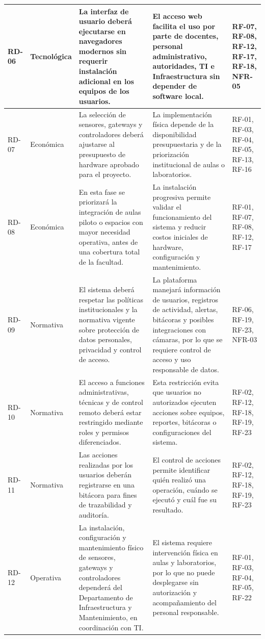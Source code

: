 \begin{longtable}{|p{3.1cm}|p{3.1cm}|p{3.1cm}|p{3.1cm}|p{3.1cm}|}
RD-06 & Tecnológica & La interfaz de usuario deberá ejecutarse en navegadores modernos sin requerir instalación adicional en los equipos de los usuarios. & El acceso web facilita el uso por parte de docentes, personal administrativo, autoridades, TI e Infraestructura sin depender de software local. & RF-07, RF-08, RF-12, RF-17, RF-18, NFR-05 \\ \hline
RD-07 & Económica & La selección de sensores, gateways y controladores deberá ajustarse al presupuesto de hardware aprobado para el proyecto. & La implementación física depende de la disponibilidad presupuestaria y de la priorización institucional de aulas o laboratorios. & RF-01, RF-03, RF-04, RF-05, RF-13, RF-16 \\ \hline
RD-08 & Económica & En esta fase se priorizará la integración de aulas piloto o espacios con mayor necesidad operativa, antes de una cobertura total de la facultad. & La instalación progresiva permite validar el funcionamiento del sistema y reducir costos iniciales de hardware, configuración y mantenimiento. & RF-01, RF-07, RF-08, RF-12, RF-17 \\ \hline
RD-09 & Normativa & El sistema deberá respetar las políticas institucionales y la normativa vigente sobre protección de datos personales, privacidad y control de acceso. & La plataforma manejará información de usuarios, registros de actividad, alertas, bitácoras y posibles integraciones con cámaras, por lo que se requiere control de acceso y uso responsable de datos. & RF-06, RF-19, RF-23, NFR-03 \\ \hline
RD-10 & Normativa & El acceso a funciones administrativas, técnicas y de control remoto deberá estar restringido mediante roles y permisos diferenciados. & Esta restricción evita que usuarios no autorizados ejecuten acciones sobre equipos, reportes, bitácoras o configuraciones del sistema. & RF-02, RF-12, RF-18, RF-19, RF-23 \\ \hline
RD-11 & Normativa & Las acciones realizadas por los usuarios deberán registrarse en una bitácora para fines de trazabilidad y auditoría. & El control de acciones permite identificar quién realizó una operación, cuándo se ejecutó y cuál fue su resultado. & RF-02, RF-12, RF-18, RF-19, RF-23 \\ \hline
RD-12 & Operativa & La instalación, configuración y mantenimiento físico de sensores, gateways y controladores dependerá del Departamento de Infraestructura y Mantenimiento, en coordinación con TI. & El sistema requiere intervención física en aulas y laboratorios, por lo que no puede desplegarse sin autorización y acompañamiento del personal responsable. & RF-01, RF-03, RF-04, RF-05, RF-22 \\ \hline

\end{longtable}
